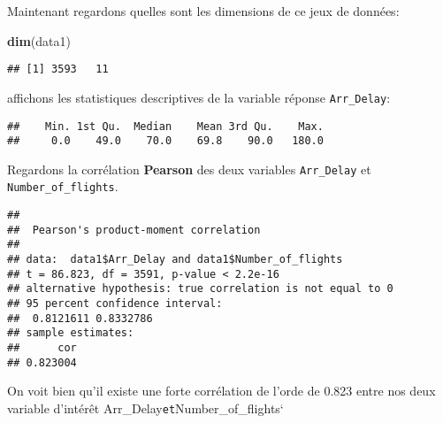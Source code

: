 \documentclass[
]{article}
\newenvironment{Shaded}{\begin{snugshade}}{\end{snugshade}}
\newcommand{\AttributeTok}[1]{\textcolor[rgb]{0.13,0.29,0.53}{#1}}
\newcommand{\FunctionTok}[1]{\textcolor[rgb]{0.13,0.29,0.53}{\textbf{#1}}}
\newcommand{\NormalTok}[1]{#1}
\newcommand{\OtherTok}[1]{\textcolor[rgb]{0.56,0.35,0.01}{#1}}
\newcommand{\SpecialCharTok}[1]{\textcolor[rgb]{0.81,0.36,0.00}{\textbf{#1}}}
\newcommand{\StringTok}[1]{\textcolor[rgb]{0.31,0.60,0.02}{#1}}
\begin{document}
Maintenant regardons quelles sont les dimensions de ce jeux de données:

\begin{Shaded}
\begin{Highlighting}[]
\FunctionTok{dim}\NormalTok{(data1)}
\end{Highlighting}
\end{Shaded}

\begin{verbatim}
## [1] 3593   11
\end{verbatim}

affichons les statistiques descriptives de la variable réponse
\texttt{Arr\_Delay}:

\begin{Shaded}
\end{Shaded}

\begin{verbatim}
##    Min. 1st Qu.  Median    Mean 3rd Qu.    Max. 
##     0.0    49.0    70.0    69.8    90.0   180.0
\end{verbatim}

Regardons la corrélation \textbf{Pearson} des deux variables
\texttt{Arr\_Delay} et \texttt{Number\_of\_flights}.

\begin{Shaded}
\end{Shaded}

\begin{verbatim}
## 
##  Pearson's product-moment correlation
## 
## data:  data1$Arr_Delay and data1$Number_of_flights
## t = 86.823, df = 3591, p-value < 2.2e-16
## alternative hypothesis: true correlation is not equal to 0
## 95 percent confidence interval:
##  0.8121611 0.8332786
## sample estimates:
##      cor 
## 0.823004
\end{verbatim}

On voit bien qu'il existe une forte corrélation de l'orde de 0.823 entre
nos deux variable d'intérêt Arr\_Delay\texttt{et}Number\_of\_flights`
\end{document}
